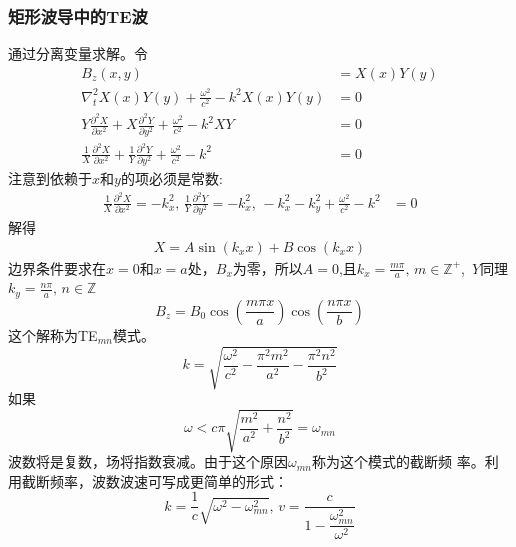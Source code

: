 \subsubsection{矩形波导中的TE波}
通过分离变量求解。令
\begin{align*}
    B_z(x,y)&=X(x)Y(y)\\
    \nabla_t^2X(x)Y(y)+\frac{\omega^2}{c^2}-k^2X(x)Y(y)&=0\\
    Y\frac{\partial^2 X}{\partial x^2}
    +X\frac{\partial^2 Y}{\partial y^2}
    +\frac{\omega^2}{c^2}-k^2XY&=0\\
    \frac{1}{X}\frac{\partial^2 X}{\partial x^2}
    +\frac{1}{Y}\frac{\partial^2 Y}{\partial y^2}
    +\frac{\omega^2}{c^2}-k^2&=0
\end{align*}
注意到依赖于$x$和$y$的项必须是常数:
\begin{align*}
    \frac{1}{X}\frac{\partial^2 X}{\partial x^2}=-k_x^2,\, 
    \frac{1}{Y}\frac{\partial^2 Y}{\partial y^2}=-k_x^2,\, 
    -k_x^2-k_y^2+\frac{\omega^2}{c^2}-k^2&=0
\end{align*}
解得
\begin{align*}
    X=A\sin(k_xx)+B\cos(k_xx)
\end{align*}
边界条件要求在$x=0$和$x=a$处，$B_x$为零，所以$A=0$,且$k_x=\frac{m\pi}{a},\, m\in \mathbb{Z}^+$,\, $Y$同理$k_y=\frac{n\pi}{a},\, n\in \mathbb{Z}$
\begin{equation}
    B_z=B_0\cos\left(\frac{m\pi x}{a}\right)\cos\left(\frac{n\pi x}{b}\right)
\end{equation}
这个解称为TE$_{mn}$模式。
\begin{equation}
    k=\sqrt{\frac{\omega^2}{c^2}-\frac{\pi^2m^2}{a^2}-\frac{\pi^2n^2}{b^2}}
\end{equation}
如果
\begin{equation}
    \omega<c\pi\sqrt{\frac{m^2}{a^2}+\frac{n^2}{b^2}}=\omega_{mn}
\end{equation}
波数将是复数，场将指数衰减。由于这个原因$\omega_{mn}$称为这个模式的截断频
率。利用截断频率，波数波速可写成更简单的形式：
\begin{equation}
    k=\frac{1}{c}\sqrt{\omega^2-\omega_{mn}^2},\, v=\dfrac{c}{1-\dfrac{\omega_{mn}^2}{\omega^2}}
\end{equation}
